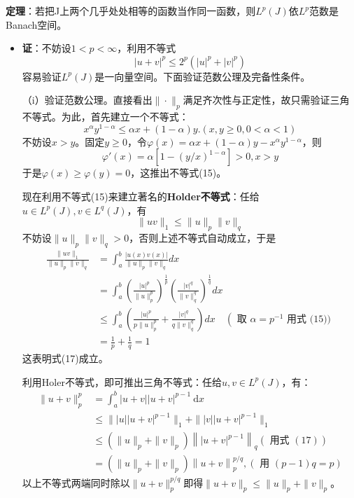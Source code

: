 \documentclass[12pt,a4paper]{article}
\begin{document}
\textbf{定理}：若把J上两个几乎处处相等的函数当作同一函数，则$L^p(J)$依$L^p$范数是Banach空间。
\begin{itemize}
	\item[]
	\textbf{证}：不妨设$1<p<\infty$，利用不等式
	\begin{equation}
		|u+v|^p\leq 2^p(|u|^p+|v|^p)
	\end{equation}
	容易验证$L^p(J)$是一向量空间。下面验证范数公理及完备性条件。
	
	（i）验证范数公理。直接看出$\|\cdot\|_p$满足齐次性与正定性，故只需验证三角不等式。为此，首先建立一个不等式：
	\begin{equation}
		x^\alpha y^{1-\alpha}\leq \alpha x+(1-\alpha)y.(x,y\geq 0,0<\alpha<1)
	\end{equation}
	不妨设$x>y$。固定$y\geq 0$，令$\varphi(x)=\alpha x+(1-\alpha)y-x^{\alpha} y^{1-\alpha}$，则
	\begin{equation}
		\varphi'(x)=\alpha[1-(y/x)^{1-\alpha}]>0,x>y
	\end{equation}
	于是$\varphi(x)\geq \varphi(y)=0$，这推出不等式(15)。
	
	现在利用不等式(15)来建立著名的\textbf{Holder不等式}：任给$u\in L^p(J),v\in L^q(J)$，有
	\begin{equation}
		\|uv\|_1\leq \|u\|_p\|v\|_q
	\end{equation}
	不妨设$\|u\|_p\|v\|_q>0$，否则上述不等式自动成立，于是
	\begin{equation}
\begin{aligned}
\frac{\|uv\|_1}{\|u\|_p\|v\|_q} &=\int_{a}^{b} \frac{|u(x) v(x)|}{\|u\|_{p}\|v\|_{q}} d x \\
&=\int_{a}^b(\frac{|u|^p}{\|u\|^p_p})^{\frac{1}{p}}(\frac{|v|^q}{\|v\|^q_q})^{\frac{1}{q}}dx\\
& \leqslant \int_{a}^{b}\left(\frac{|u|^{p}}{p \|u \|_{p}^{p}}+\frac{|v|^q}{q \|v\|_q^q}\right) d x \quad\left(\text { 取 } \alpha=p^{-1}\right. \text { 用式 (15)) }\\
&=\frac{1}{p}+\frac{1}{q}=1
\end{aligned}
\end{equation}
这表明式(17)成立。

利用Holer不等式，即可推出三角不等式：任给$u,v\in L^p(J)$，有：
\begin{equation}
\begin{aligned}
\|u+v\|_{p}^{p} &=\int_{a}^{b}|u+v||u+v|^{p-1} \mathrm{~d} x \\
& \leqslant \||u||u+v|^{p-1}\|_1+\||v||u+v|^{p-1}\|_1\\
& \leqslant\left(\|u\|_{p}+\|v\|_{p}\right)\left\||u+v|^{p-1}\right\|_{q}(\text { 用式 }(17)) \\
&=\left(\|u\|_{p}+\|v\|_{p}\right)\left\|{u+v}\right\|_{p}^{p / q},(\text { 用 }(p-1) q=p)
\end{aligned}
\end{equation}
以上不等式两端同时除以$\|u+v\|_p^{p/q}$即得$\|u+v\|_p\leq \|u\|_p+\|v\|_p$。


\end{itemize}
\end{document}

